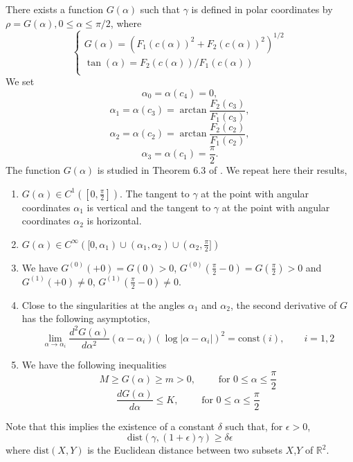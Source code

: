 \documentclass[12pt]{amsart}
\numberwithin{equation}{subsection}
\theoremstyle{definition}
\theoremstyle{plain}
\begin{document}
There exists a function $G(\alpha)$ such that $\gamma$ is defined in polar coordinates by $\rho = G(\alpha), 0 \leq \alpha \leq \pi /2$,
where
\[
\begin{cases}
G(\alpha) = (F_1(c(\alpha))^2+F_2(c(\alpha))^2)^{1/2}\\
\tan (\alpha) = F_2(c(\alpha))/F_1(c(\alpha))\\
\end{cases}
\]
We set
\[
\alpha_0 = \alpha(c_4) = 0,
\]
\[
\alpha_1 = \alpha(c_3) = \arctan \frac{F_2(c_3)}{F_1(c_3)},
\]
\[
\alpha_2 = \alpha(c_2) = \arctan \frac{F_2(c_2)}{F_1(c_2)},
\]
\[
\alpha_3 = \alpha(c_1) = \frac{\pi}{2}.
\]
The function $G(\alpha)$ is studied in Theorem 6.3 of \cite{1}. We repeat here their results,
\begin{enumerate}
\item $G(\alpha) \in C^1([0, \frac{\pi}{2}])$. The tangent to $\gamma$ at the point with
angular coordinates $\alpha_1$ is vertical and the tangent to $\gamma$ at the point with angular coordinates $\alpha_2$ is horizontal.
\item $G(\alpha) \in C^{\infty}([0, \alpha_1) \cup (\alpha_1, \alpha_2) \cup (\alpha_2,\frac{\pi}{2}])$
\item We have $G^{(0)}(+0) = G(0) > 0$, $G^{(0)}(\frac{\pi}{2}-0) = G(\frac{\pi}{2}) > 0$ and
$G^{(1)}(+0) \neq 0$, $G^{(1)}(\frac{\pi}{2}-0)\neq 0$.
\item Close to the singularities at the angles $\alpha_1$ and $\alpha_2$, the second derivative of $G$ has the
following asymptotics,
\[
\lim_{\alpha \rightarrow \alpha_i} \frac{d^2G(\alpha)}{d\alpha^2} (\alpha - \alpha_i)(\log|\alpha - \alpha_i|)^2 = \text{const}(i) , \qquad i = 1,2
\]
\item We have the following inequalities
\[
M \geq G(\alpha) \geq m > 0, \qquad \text{ for } 0 \leq \alpha \leq \frac{\pi}{2}
\]
\[
\frac{dG(\alpha)}{d\alpha}\leq K, \qquad \text{ for }  0 \leq \alpha \leq \frac{\pi}{2}
\]
\end{enumerate}
Note that this implies the existence of a constant $\delta$ such that, for $\epsilon > 0$,
\begin{equation}
\label{varib}
\text{dist}(\gamma,(1+\epsilon)\gamma) \geq \delta \epsilon
\end{equation}
where $\text{dist}(X,Y)$ is the Euclidean distance between two subsets $X$,$Y$ of $\mathbb R^2$.
\end{document}
